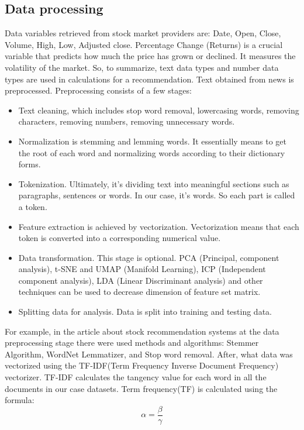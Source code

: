 \documentclass[10pt,twoside,english,a4paper]{article}
\begin{document}
\subsection{Data processing}
\par Data variables retrieved from stock market providers are: Date, Open, Close, Volume, High, Low, Adjusted close. Percentage Change (Returns) is a crucial variable that predicts how much the price has grown or declined. It measures the volatility of the market. So, to summarize, text data types and number data types are used in calculations for a recommendation. Text obtained from news is preprocessed. Preprocessing consists of a few stages:
\begin{itemize}
    \item Text cleaning, which includes stop word removal, lowercasing words, removing characters, removing numbers, removing unnecessary words.
    \item Normalization is stemming and lemming words. It essentially means to get the root of each word and normalizing words according to their dictionary forms.
    \item Tokenization. Ultimately, it's dividing text into meaningful sections such as paragraphs, sentences or words. In our case, it's words. So each part is called a token.
    \item Feature extraction is achieved by vectorization. Vectorization means that each token is converted into a corresponding numerical value. 
    \item Data transformation. This stage is optional. PCA (Principal, component analysis), t-SNE and UMAP (Manifold Learning), ICP (Independent component analysis), LDA (Linear Discriminant analysis) and other techniques can be used to decrease dimension of feature set matrix.\cite{dimens_red}
    \item Splitting data for analysis. Data is split into training and testing data.\cite{nlp_research1}\cite{nlp_research2}
\end{itemize}
For example, in the article about stock recommendation systems\cite{stock_rec} at the data preprocessing stage there were used methods and algorithms: Stemmer Algorithm, WordNet Lemmatizer, and Stop word removal. After, what data was vectorized using the TF-IDF(Term Frequency Inverse Document Frequency) vectorizer.\cite{stem_alg}\cite{lemm_alg} TF-IDF calculates the tangency value for each word in all the documents in our case datasets. 
Term frequency(TF) is calculated using the formula:
\[ \alpha = \frac{\beta}{\gamma}\]
\end{document}
